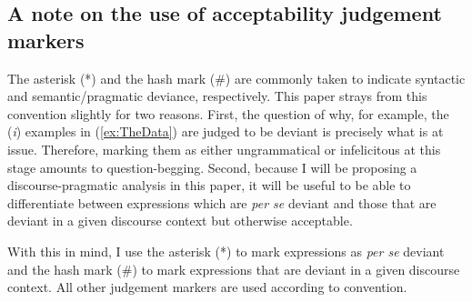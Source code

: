 \documentclass[
]{RCL}
\begin{document}
\subsection{A note on the use of acceptability judgement markers}
The asterisk (*) and the hash mark (\#) are commonly taken to indicate syntactic and semantic/pragmatic deviance, respectively.
This paper strays from this convention slightly for two reasons.
First, the question of why, for example, the (\textit{i}) examples in (\ref{ex:TheData}) are judged to be deviant is precisely what is at issue.
Therefore, marking them as either ungrammatical or infelicitous at this stage amounts to question-begging.
Second, because I will be proposing a discourse-pragmatic analysis in this paper, it will be useful to be able to differentiate between expressions which are \textit{per se} deviant and those that are deviant in a given discourse context but otherwise acceptable.

With this in mind, I use the asterisk (*) to mark expressions as \textit{per se} deviant and the hash mark (\#) to mark expressions that are deviant in a given discourse context. 
All other judgement markers are used according to convention.
\end{document}

